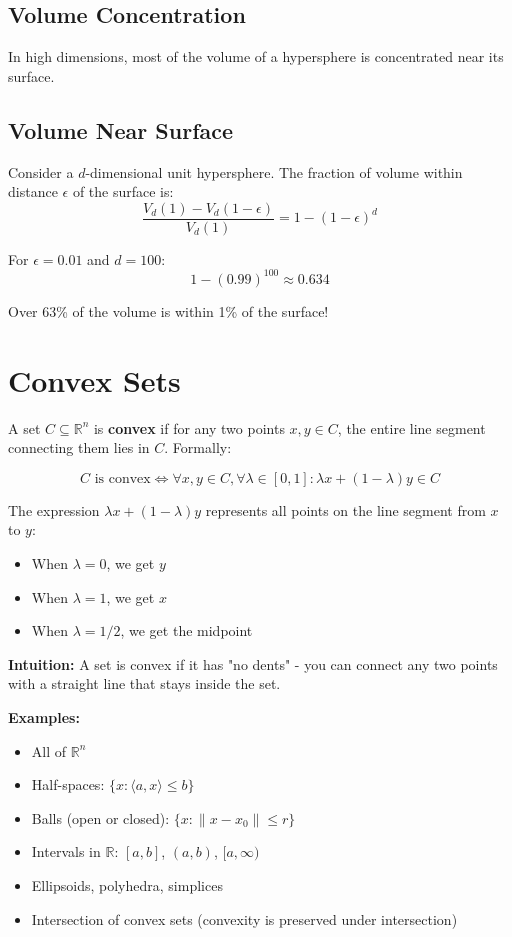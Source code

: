 \documentclass{tufte-handout}
\begin{document}
\subsection{Volume Concentration}

In high dimensions, most of the volume of a hypersphere is concentrated near its surface.

\subsection{Volume Near Surface}
Consider a $d$-dimensional unit hypersphere. The fraction of volume within distance $\epsilon$ of the surface is:
\begin{equation}
\frac{V_d(1) - V_d(1-\epsilon)}{V_d(1)} = 1 - (1-\epsilon)^d
\end{equation}


For $\epsilon = 0.01$ and $d = 100$:
\begin{equation}
1 - (0.99)^{100} \approx 0.634
\end{equation}

Over 63\% of the volume is within 1\% of the surface!


\section{Convex Sets}

A set $C \subseteq \mathbb{R}^n$ is \textbf{convex} if for any two points $x, y \in C$, the entire line segment connecting them lies in $C$. Formally:

\[
C \text{ is convex} \iff \forall x, y \in C, \forall \lambda \in [0, 1]: \lambda x + (1 - \lambda) y \in C
\]

The expression $\lambda x + (1 - \lambda) y$ represents all points on the line segment from $x$ to $y$:
\begin{itemize}
    \item When $\lambda = 0$, we get $y$
    \item When $\lambda = 1$, we get $x$
    \item When $\lambda = 1/2$, we get the midpoint
\end{itemize}

\textbf{Intuition:} A set is convex if it has "no dents" - you can connect any two points with a straight line that stays inside the set.

\textbf{Examples:}
\begin{itemize}
    \item All of $\mathbb{R}^n$
    \item Half-spaces: $\{x : \langle a, x \rangle \leq b\}$
    \item Balls (open or closed): $\{x : \|x - x_0\| \leq r\}$
    \item Intervals in $\mathbb{R}$: $[a, b]$, $(a, b)$, $[a, \infty)$
    \item Ellipsoids, polyhedra, simplices
    \item Intersection of convex sets (convexity is preserved under intersection)
\end{itemize}
\end{document}
